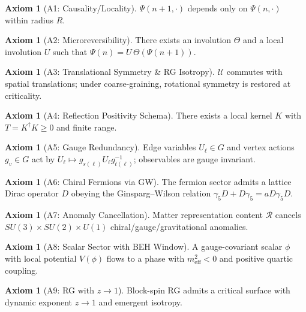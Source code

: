 \documentclass[11pt]{article}
\theoremstyle{plain}
\theoremstyle{definition}
\newtheorem{axiom}[theorem]{Axiom}
\theoremstyle{remark}
\begin{document}
\begin{axiom}[A1: Causality/Locality]\label{ax:A1}
$\Psi(n+1,\cdot)$ depends only on $\Psi(n,\cdot)$ within radius $R$.
\end{axiom}

\begin{axiom}[A2: Microreversibility]\label{ax:A2}
There exists an involution $\Theta$ and a local involution $U$ such that $\Psi(n)=U\,\Theta(\Psi(n+1))$.
\end{axiom}

\begin{axiom}[A3: Translational Symmetry \& RG Isotropy]\label{ax:A3}
$\mathcal{U}$ commutes with spatial translations; under coarse-graining, rotational symmetry is restored at criticality.
\end{axiom}

\begin{axiom}[A4: Reflection Positivity Schema]\label{ax:A4}
There exists a local kernel $K$ with $T=K^\dagger K\ge 0$ and finite range.
\end{axiom}

\begin{axiom}[A5: Gauge Redundancy]\label{ax:A5}
Edge variables $U_\ell\in G$ and vertex actions $g_v\in G$ act by $U_\ell\mapsto g_{s(\ell)}U_\ell g^{-1}_{t(\ell)}$; observables are gauge invariant.
\end{axiom}

\begin{axiom}[A6: Chiral Fermions via GW]\label{ax:A6}
The fermion sector admits a lattice Dirac operator $D$ obeying the Ginsparg--Wilson relation $\gamma_5 D+D\gamma_5 = a D\gamma_5 D$.
\end{axiom}

\begin{axiom}[A7: Anomaly Cancellation]\label{ax:A7}
Matter representation content $\mathcal{R}$ cancels $SU(3)\times SU(2)\times U(1)$ chiral/gauge/gravitational anomalies.
\end{axiom}

\begin{axiom}[A8: Scalar Sector with BEH Window]\label{ax:A8}
A gauge-covariant scalar $\phi$ with local potential $V(\phi)$ flows to a phase with $m^2_{\mathrm{eff}}<0$ and positive quartic coupling.
\end{axiom}

\begin{axiom}[A9: RG with $z\to 1$]\label{ax:A9}
Block-spin RG admits a critical surface with dynamic exponent $z\to 1$ and emergent isotropy.
\end{axiom}
\end{document}
